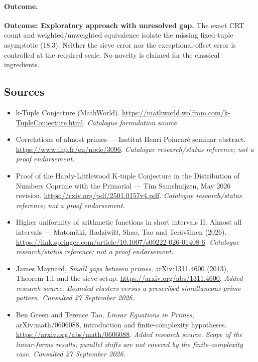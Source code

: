 \documentclass[11pt,a4paper]{article}
\begin{document}
\paragraph{Outcome.}
\textbf{Outcome: Exploratory approach with unresolved gap.}
The exact CRT count and weighted/unweighted equivalence isolate the
missing fixed-tuple asymptotic (18.3). Neither the sieve error nor the
exceptional-offset error is controlled at the required scale. No novelty
is claimed for the classical ingredients.
\subsection{Sources}
\begin{itemize}\raggedright
\item[\textnormal{[S1]}]\hypertarget{source:30006682:1}{} k-Tuple Conjecture (MathWorld).
\url{https://mathworld.wolfram.com/k-TupleConjecture.html}.
{\small\textit{Catalogue formulation source.}}
\item[\textnormal{[S2]}]\hypertarget{source:30006682:2}{} Correlations of almost primes — Institut Henri Poincaré seminar abstract.
\url{https://www.ihp.fr/en/node/3096}.
{\small\textit{Catalogue research/status reference; not a proof endorsement.}}
\item[\textnormal{[S3]}]\hypertarget{source:30006682:3}{} Proof of the Hardy-Littlewood K-tuple Conjecture in the Distribution of Numbers Coprime with the Primorial — Tim Samshuijzen, May 2026 revision.
\url{https://rxiv.org/pdf/2501.0157v4.pdf}.
{\small\textit{Catalogue research/status reference; not a proof endorsement.}}
\item[\textnormal{[S4]}]\hypertarget{source:30006682:4}{} Higher uniformity of arithmetic functions in short intervals II. Almost all intervals — Matomäki, Radziwiłł, Shao, Tao and Teräväinen (2026).
\url{https://link.springer.com/article/10.1007/s00222-026-01408-6}.
{\small\textit{Catalogue research/status reference; not a proof endorsement.}}
\item[\textnormal{[E1]}]\hypertarget{extra:30006682:1}{} James Maynard, \emph{Small gaps between primes}, arXiv:1311.4600 (2013), Theorem 1.1 and the sieve setup.
\url{https://arxiv.org/abs/1311.4600}.
{\small\textit{Added research source. Bounded clusters versus a prescribed simultaneous prime pattern. Consulted 27 September 2026.}}
\item[\textnormal{[E2]}]\hypertarget{extra:30006682:2}{} Ben Green and Terence Tao, \emph{Linear Equations in Primes}, arXiv:math/0606088, introduction and finite-complexity hypotheses.
\url{https://arxiv.org/abs/math/0606088}.
{\small\textit{Added research source. Scope of the linear-forms results; parallel shifts are not covered by the finite-complexity case. Consulted 27 September 2026.}}
\end{itemize}

\end{document}
